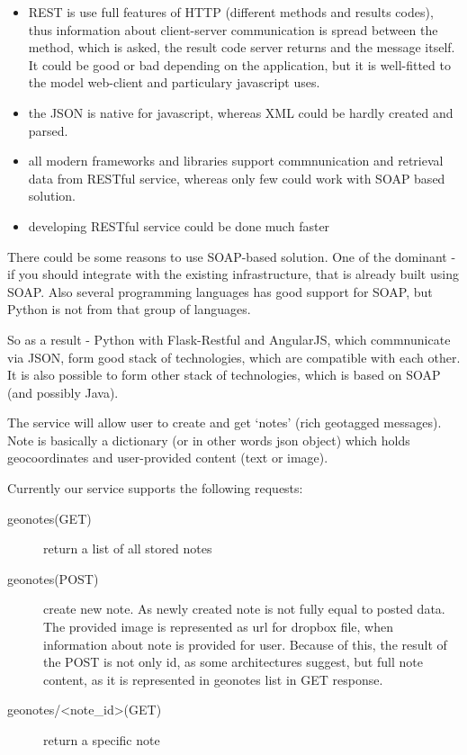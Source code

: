 \documentclass[12pt,a4paper]{article}
\begin{document}
\begin{itemize}
    \item REST is use full features of HTTP (different methods and results codes),
        thus information about client-server communication is spread between the
        method, which is asked, the result code server returns and the message itself.
        It could be good or bad depending on the application, but it is well-fitted
        to the model web-client and particulary javascript uses.
    \item the JSON is native for javascript, whereas XML could be hardly created and parsed.
    \item all modern frameworks and libraries support commnunication and retrieval data from RESTful
        service, whereas only few could work with SOAP based solution.
    \item developing RESTful service could be done much faster
\end{itemize}

There could be some reasons to use SOAP-based solution. One of the dominant -
if you should integrate with the existing infrastructure, that is already built
using SOAP. Also several programming languages has good support for SOAP, but
Python is not from that group of languages.

So as a result - Python with Flask-Restful and AngularJS, which commnunicate via JSON,
form good stack of technologies, which are compatible with each other.
It is also possible to form other stack of technologies, which is based on SOAP
(and possibly Java).

The service will allow user to create and get `notes' (rich geotagged messages). Note is basically a
dictionary (or in other words json object) which holds geocoordinates and user-provided content (text or image).

Currently our service supports the following requests:
\begin{description}
    \item[geonotes(GET)] return a list of all stored notes
    \item[geonotes(POST)] create new note. As newly created note is not fully equal to posted data.
        The provided image is represented as url for dropbox file, when information about note
        is provided for user. Because of this, the result of the POST is not only id, as
        some architectures suggest, but full note content, as it is represented in geonotes list in GET response.
    \item[geonotes/<note\_id>(GET)] return a specific note
\end{description}
\end{document}
